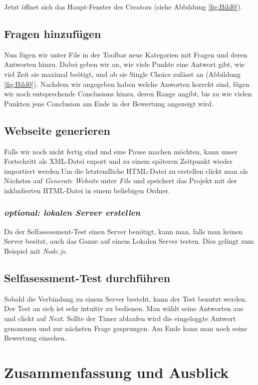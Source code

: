 \documentclass[a4paper,12pt,headsepline,twocolumn]{scrartcl}
\begin{document}
Jetzt öffnet sich das Haupt-Fenster des Creators (siehe Abbildung \ref{fig:Bild0}).
\subsection{Fragen hinzufügen}
Nun fügen wir unter File in der Toolbar neue Kategorien mit Fragen und deren Antworten hinzu. Dabei geben wir an, wie viele Punkte eine Antwort gibt, wie viel Zeit sie maximal beötigt, und ob sie Single Choice zulässt an (Abbildung \ref{fig:Bild0}). Nachdem wir angegeben haben welche Anworten korrekt sind, fügen wir noch entsprechende Conclusions hinzu, deren Range angibt, bis zu wie vielen Punkten jene Conclusion am Ende in der Bewertung angezeigt wird. 
\subsection{Webseite generieren}
Falls wir noch nicht fertig sind und eine Pause machen möchten, kann unser Fortschritt als XML-Datei export und zu einem späteren Zeitpunkt wieder importiert werden.\newline Um die letztendliche HTML-Datei zu erstellen clickt man als Nächstes auf \textit{Generate Website} unter \textit{File} und speichert das Projekt mit der inkludierten HTML-Datei in einem beliebigen Ordner.
\subsubsection*{\textit{optional: lokalen Server erstellen}}
Da der Selfassessment-Test einen Server benötigt, kann man, falls man keinen Server besitzt, auch das Ganze auf einem Lokalen Server testen. Dies gelingt zum Beispiel mit \textit{Node.js}.
\subsection{Selfasessment-Test durchführen}
Sobald die Verbindung zu einem Server besteht, kann der Test benutzt werden. Der Test an sich ist sehr intuitiv zu bedienen. Man wählt seine Antworten aus und clickt auf \textit{Next}. Sollte der Timer ablaufen wird die eingeloggte Antwort genommen und zur nächsten Frage gesprungen. Am Ende kann man noch seine Bewertung einsehen.

\section{Zusammenfassung und Ausblick}

\onecolumn
\singlespacing
\newpage
{}
\renewcommand\refname{Literaturverzeichnis}


\end{document}
